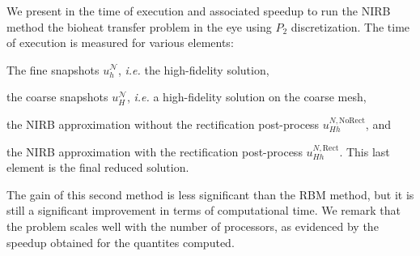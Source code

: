We present in  the time of execution and associated speedup to run the NIRB method the bioheat transfer problem in the eye using $P_2$ discretization.
The time of execution is measured for various elements:
\begin{inparaenum}[\it (i)]
    \item The fine snapshots $u_h^\mathcal{N}$, \emph{i.e.} the high-fidelity solution,
    \item the coarse snapshots $u_H^\mathcal{N}$, \emph{i.e.} a high-fidelity solution on the coarse mesh,
    \item the NIRB approximation without the rectification post-process $u_{Hh}^{N,\text{NoRect}}$, and
    \item the NIRB approximation with the rectification post-process $u_{Hh}^{N,\text{Rect}}$. This last element is the final reduced solution.
\end{inparaenum}
%
The gain of this second method is less significant than the RBM method, but it is still a significant improvement in terms of computational time.
We remark that the problem scales well with the number of processors, as evidenced by the speedup obtained for the quantites computed.



\begin{table}
    \centering

\end{table}


